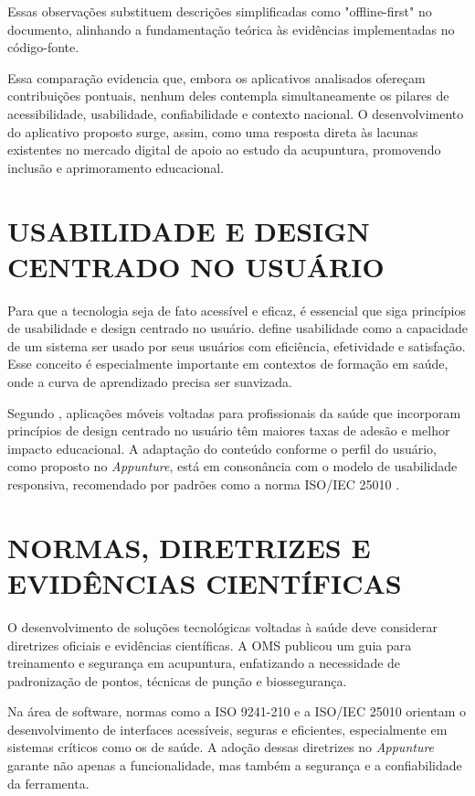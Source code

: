 Essas observações substituem descrições simplificadas como "offline-first" no documento, alinhando a fundamentação teórica às evidências implementadas no código-fonte.

Essa comparação evidencia que, embora os aplicativos analisados ofereçam contribuições pontuais, nenhum deles contempla simultaneamente os pilares de acessibilidade, usabilidade, confiabilidade e contexto nacional. O desenvolvimento do aplicativo proposto surge, assim, como uma resposta direta às lacunas existentes no mercado digital de apoio ao estudo da acupuntura, promovendo inclusão e aprimoramento educacional.

\section{USABILIDADE E DESIGN CENTRADO NO USUÁRIO} \label{sec:usabilidade}

Para que a tecnologia seja de fato acessível e eficaz, é essencial que siga princípios de usabilidade e design centrado no usuário.  define usabilidade como a capacidade de um sistema ser usado por seus usuários com eficiência, efetividade e satisfação. Esse conceito é especialmente importante em contextos de formação em saúde, onde a curva de aprendizado precisa ser suavizada.

Segundo , aplicações móveis voltadas para profissionais da saúde que incorporam princípios de design centrado no usuário têm maiores taxas de adesão e melhor impacto educacional. A adaptação do conteúdo conforme o perfil do usuário, como proposto no \textit{Appunture}, está em consonância com o modelo de usabilidade responsiva, recomendado por padrões como a norma ISO/IEC 25010 \cite{iso25010}.

\section{NORMAS, DIRETRIZES E EVIDÊNCIAS CIENTÍFICAS} \label{sec:normas}

O desenvolvimento de soluções tecnológicas voltadas à saúde deve considerar diretrizes oficiais e evidências científicas. A OMS \cite{oms1999} publicou um guia para treinamento e segurança em acupuntura, enfatizando a necessidade de padronização de pontos, técnicas de punção e biossegurança.

Na área de software, normas como a ISO 9241-210 \cite{iso9241} e a ISO/IEC 25010 \cite{iso25010} orientam o desenvolvimento de interfaces acessíveis, seguras e eficientes, especialmente em sistemas críticos como os de saúde. A adoção dessas diretrizes no \textit{Appunture} garante não apenas a funcionalidade, mas também a segurança e a confiabilidade da ferramenta.

